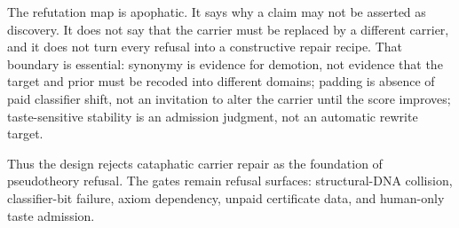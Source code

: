 The refutation map is apophatic.  It says why a claim may not be asserted as
discovery.  It does not say that the carrier must be replaced by a different
carrier, and it does not turn every refusal into a constructive repair recipe.
That boundary is essential: synonymy is evidence for demotion, not evidence
that the target and prior must be recoded into different domains; padding is
absence of paid classifier shift, not an invitation to alter the carrier until
the score improves; taste-sensitive stability is an admission judgment, not an
automatic rewrite target.

Thus the design rejects cataphatic carrier repair as the foundation of
pseudotheory refusal.  The gates remain refusal surfaces: structural-DNA
collision, classifier-bit failure, axiom dependency, unpaid certificate data,
and human-only taste admission.

